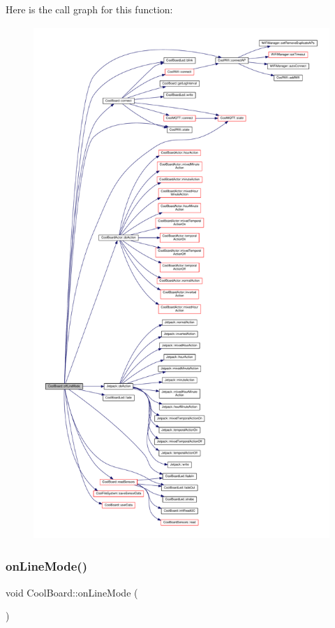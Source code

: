 Here is the call graph for this function\+:
\nopagebreak
\begin{figure}[H]
\begin{center}
\leavevmode
\includegraphics[height=550pt]{d7/df9/class_cool_board_ae6b5e1274d760462290192acea4adca8_cgraph}
\end{center}
\end{figure}
\mbox{\label{class_cool_board_aa0bbc4bc605e35618d18e68795c61363}} 
\subsubsection{\texorpdfstring{on\+Line\+Mode()}{onLineMode()}}
{\footnotesize\ttfamily void Cool\+Board\+::on\+Line\+Mode (\begin{DoxyParamCaption}{ }\end{DoxyParamCaption})}

